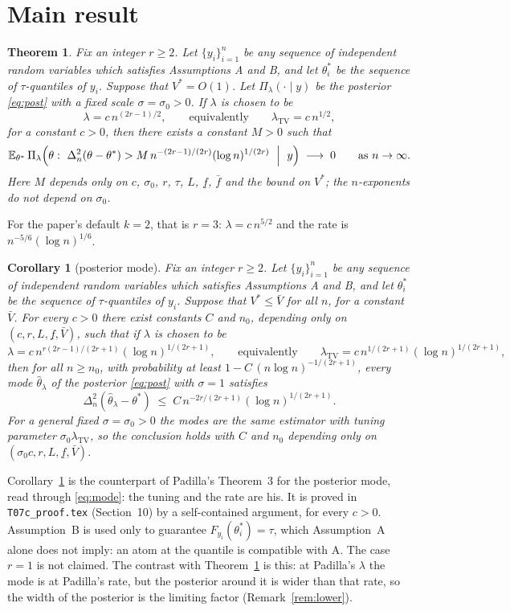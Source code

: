\documentclass[11pt]{article}
\newtheorem{theorem}{Theorem}
\newtheorem{corollary}{Corollary}
\theoremstyle{definition}
\theoremstyle{remark}
\newcommand{\E}{\mathbb{E}}
\newcommand{\TV}{\mathrm{TV}}
\newcommand{\lamtv}{\lambda_{\TV}}
\newcommand{\thetas}{\theta^{*}}
\begin{document}
\section{Main result}

\begin{theorem}\label{thm:main}
Fix an integer $r\ge 2$. Let $\{y_i\}_{i=1}^n$ be any sequence of independent random variables which satisfies Assumptions A and B, and let $\thetas_i$ be the sequence of $\tau$-quantiles of $y_i$. Suppose that $V^{*}=O(1)$. Let $\Pi_\lambda(\cdot\mid y)$ be the posterior \eqref{eq:post} with a fixed scale $\sigma=\sigma_0>0$. If $\lambda$ is chosen to be
\[
\lambda=c\,n^{(2r-1)/2},\qquad\text{equivalently}\qquad \lamtv=c\,n^{1/2},
\]
for a constant $c>0$, then there exists a constant $M>0$ such that
\[
\E_{\thetas}\,\Pi_\lambda\Bigl(\theta:\ \Delta_n^2(\theta-\thetas)>M\,n^{-(2r-1)/(2r)}(\log n)^{1/(2r)}\ \Bigm|\ y\Bigr)\;\longrightarrow\;0
\qquad\text{as } n\to\infty .
\]
Here $M$ depends only on $c$, $\sigma_0$, $r$, $\tau$, $L$, $\underline f$, $\bar f$ and the bound on $V^{*}$; the $n$-exponents do not depend on $\sigma_0$.
\end{theorem}

For the paper's default $k=2$, that is $r=3$: $\lambda=c\,n^{5/2}$ and the rate is $n^{-5/6}(\log n)^{1/6}$.

\begin{corollary}[posterior mode]\label{cor:mode}
Fix an integer $r\ge 2$. Let $\{y_i\}_{i=1}^n$ be any sequence of independent random variables which satisfies Assumptions A and B, and let $\thetas_i$ be the sequence of $\tau$-quantiles of $y_i$. Suppose that $V^{*}\le\bar V$ for all $n$, for a constant $\bar V$. For every $c>0$ there exist constants $C$ and $n_0$, depending only on $(c,r,L,\underline f,\bar V)$, such that if $\lambda$ is chosen to be
\[
\lambda=c\,n^{r(2r-1)/(2r+1)}(\log n)^{1/(2r+1)},\qquad\text{equivalently}\qquad \lamtv=c\,n^{1/(2r+1)}(\log n)^{1/(2r+1)},
\]
then for all $n\ge n_0$, with probability at least $1-C\,(n\log n)^{-1/(2r+1)}$, every mode $\hat\theta_\lambda$ of the posterior \eqref{eq:post} with $\sigma=1$ satisfies
\[
\Delta_n^2(\hat\theta_\lambda-\thetas)\;\le\;C\,n^{-2r/(2r+1)}(\log n)^{1/(2r+1)} .
\]
For a general fixed $\sigma=\sigma_0>0$ the modes are the same estimator with tuning parameter $\sigma_0\lamtv$, so the conclusion holds with $C$ and $n_0$ depending only on $(\sigma_0c,r,L,\underline f,\bar V)$.
\end{corollary}

Corollary~\ref{cor:mode} is the counterpart of Padilla's Theorem~3 for the posterior mode, read through \eqref{eq:mode}: the tuning and the rate are his. It is proved in \texttt{T07c\_proof.tex} (Section~10) by a self-contained argument, for every $c>0$. Assumption~B is used only to guarantee $F_{y_i}(\thetas_i)=\tau$, which Assumption~A alone does not imply: an atom at the quantile is compatible with A. The case $r=1$ is not claimed. The contrast with Theorem~\ref{thm:main} is this: at Padilla's $\lambda$ the mode is at Padilla's rate, but the posterior around it is wider than that rate, so the width of the posterior is the limiting factor (Remark~\ref{rem:lower}).
\end{document}
